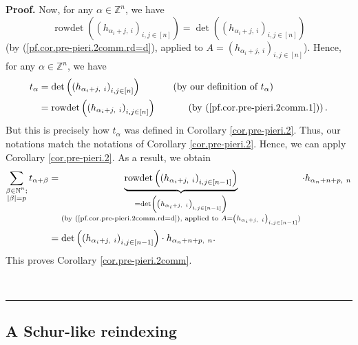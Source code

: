 \documentclass
[numbers=enddot,12pt,final,onecolumn,notitlepage,english]{scrartcl}%
\theoremstyle{definition}
\newenvironment{proof}[1][Proof]{\noindent\textbf{#1.} }{\ \rule{0.5em}{0.5em}}
\let\sumnonlimits\sum
\renewcommand{\sum}{\sumnonlimits\limits}
\newenvironment{verlong}{}{}
\begin{document}
\begin{proof}
\begin{verlong}
Now, for any $\alpha\in\mathbb{Z}^{n}$, we have%
\begin{equation}
\operatorname*{rowdet}\left(  \left(  h_{\alpha_{i}+j,\ i}\right)
_{i,j\in\left[  n\right]  }\right)  =\det\left(  \left(  h_{\alpha_{i}%
+j,\ i}\right)  _{i,j\in\left[  n\right]  }\right)
\label{pf.cor.pre-pieri.2comm.1}%
\end{equation}
(by (\ref{pf.cor.pre-pieri.2comm.rd=d}), applied to $A=\left(  h_{\alpha
_{i}+j,\ i}\right)  _{i,j\in\left[  n\right]  }$). Hence, for any $\alpha
\in\mathbb{Z}^{n}$, we have%
\begin{align*}
t_{\alpha}  &  =\det\left(  \left(  h_{\alpha_{i}+j,\ i}\right)
_{i,j\in\left[  n\right]  }\right)  \ \ \ \ \ \ \ \ \ \ \left(  \text{by our
definition of }t_{\alpha}\right) \\
&  =\operatorname*{rowdet}\left(  \left(  h_{\alpha_{i}+j,\ i}\right)
_{i,j\in\left[  n\right]  }\right)  \ \ \ \ \ \ \ \ \ \ \left(  \text{by
(\ref{pf.cor.pre-pieri.2comm.1})}\right)  .
\end{align*}
But this is precisely how $t_{\alpha}$ was defined in Corollary
\ref{cor.pre-pieri.2}. Thus, our notations match the notations of Corollary
\ref{cor.pre-pieri.2}. Hence, we can apply Corollary \ref{cor.pre-pieri.2}. As
a result, we obtain%
\begin{align*}
\sum_{\substack{\beta\in\mathbb{N}^{n};\\\left\vert \beta\right\vert
=p}}t_{\alpha+\beta}  &  =\underbrace{\operatorname*{rowdet}\left(  \left(
h_{\alpha_{i}+j,\ i}\right)  _{i,j\in\left[  n-1\right]  }\right)
}_{\substack{=\det\left(  \left(  h_{\alpha_{i}+j,\ i}\right)  _{i,j\in\left[
n-1\right]  }\right)  \\\text{(by (\ref{pf.cor.pre-pieri.2comm.rd=d}), applied
to }A=\left(  h_{\alpha_{i}+j,\ i}\right)  _{i,j\in\left[  n-1\right]
}\text{)}}}\cdot h_{\alpha_{n}+n+p,\ n}\\
&  =\det\left(  \left(  h_{\alpha_{i}+j,\ i}\right)  _{i,j\in\left[
n-1\right]  }\right)  \cdot h_{\alpha_{n}+n+p,\ n}.
\end{align*}
This proves Corollary \ref{cor.pre-pieri.2comm}. \qedhere

\end{verlong}
\end{proof}

\subsection{A Schur-like reindexing}
\end{document}

